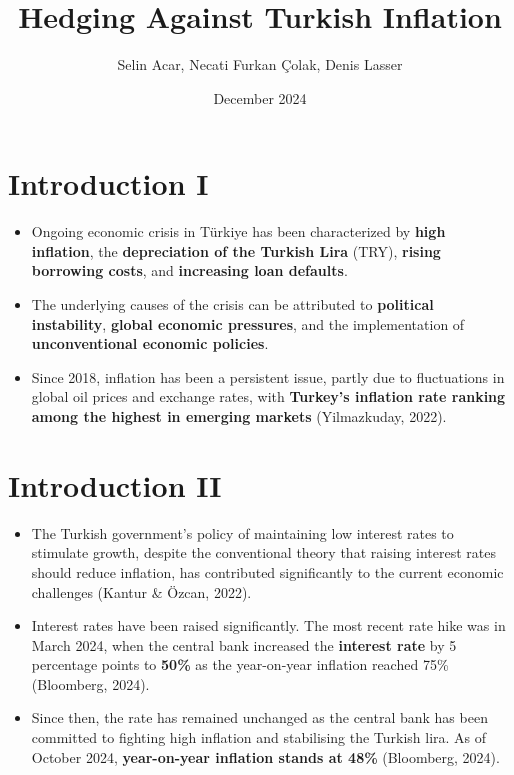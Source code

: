 \documentclass[
  11pt,
]{article}
\title{Hedging Against Turkish Inflation}
\author{Selin Acar, Necati Furkan Çolak, Denis Lasser}
\date{December 2024}
\providecommand{\tightlist}{%
  \setlength{\itemsep}{0pt}\setlength{\parskip}{0pt}}
\begin{document}
\maketitle

\section{Introduction I}\label{introduction-i}

\begin{itemize}
\tightlist
\item
  Ongoing economic crisis in Türkiye has been characterized by
  \textbf{high inflation}, the \textbf{depreciation of the Turkish Lira}
  (TRY), \textbf{rising borrowing costs}, and \textbf{increasing loan
  defaults}.
\item
  The underlying causes of the crisis can be attributed to
  \textbf{political instability}, \textbf{global economic pressures},
  and the implementation of \textbf{unconventional economic policies}.
\item
  Since 2018, inflation has been a persistent issue, partly due to
  fluctuations in global oil prices and exchange rates, with
  \textbf{Turkey's inflation rate ranking among the highest in emerging
  markets} (Yilmazkuday, 2022).
\end{itemize}

\section{Introduction II}\label{introduction-ii}

\begin{itemize}
\tightlist
\item
  The Turkish government's policy of maintaining low interest rates to
  stimulate growth, despite the conventional theory that raising
  interest rates should reduce inflation, has contributed significantly
  to the current economic challenges (Kantur \& Özcan, 2022).
\item
  Interest rates have been raised significantly. The most recent rate
  hike was in March 2024, when the central bank increased the
  \textbf{interest rate} by 5 percentage points to \textbf{50\%} as the
  year-on-year inflation reached 75\% (Bloomberg, 2024).
\item
  Since then, the rate has remained unchanged as the central bank has
  been committed to fighting high inflation and stabilising the Turkish
  lira. As of October 2024, \textbf{year-on-year inflation stands at
  48\%} (Bloomberg, 2024).
\end{itemize}
\end{document}
